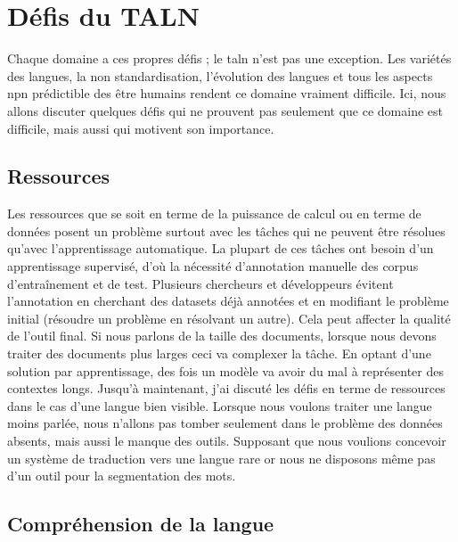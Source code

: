 \documentclass{KodeBook}
\begin{document}
\section{Défis du TALN}

Chaque domaine a ces propres défis ; le \ac{taln} n'est pas une exception. 
Les variétés des langues, la non standardisation, l'évolution des langues et tous les aspects npn prédictible des être humains rendent ce domaine vraiment difficile.
Ici, nous allons discuter quelques défis qui ne prouvent pas seulement que ce domaine est difficile, mais aussi qui motivent son importance.

\subsection{Ressources}

Les ressources que se soit en terme de la puissance de calcul ou en terme de données posent un problème surtout avec les tâches qui ne peuvent être résolues qu'avec l'apprentissage automatique.
La plupart de ces tâches ont besoin d'un apprentissage supervisé, d'où la nécessité d'annotation manuelle des corpus d'entraînement et de test. 
Plusieurs chercheurs et développeurs évitent l'annotation en cherchant des datasets déjà annotées et en modifiant le problème initial (résoudre un problème en résolvant un autre). 
Cela peut affecter la qualité de l'outil final. 
Si nous parlons de la taille des documents, lorsque nous devons traiter des documents plus larges ceci va complexer la tâche. 
En optant d'une solution par apprentissage, des fois un modèle va avoir du mal à représenter des contextes longs. 
Jusqu'à maintenant, j'ai discuté les défis en terme de ressources dans le cas d'une langue bien visible. 
Lorsque nous voulons traiter une langue moins parlée, nous n'allons pas tomber seulement dans le problème des données absents, mais aussi le manque des outils. 
Supposant que nous voulions concevoir un système de traduction vers une langue rare or nous ne disposons même pas d'un outil pour la segmentation des mots.

\subsection{Compréhension de la langue}
\end{document}
